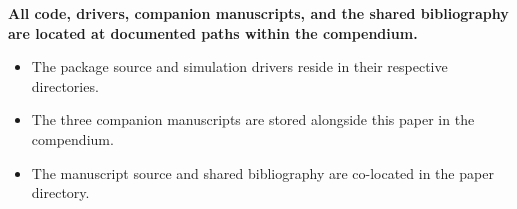 \documentclass[
  11pt,
]{article}
\begin{document}
\textbf{All code, drivers, companion manuscripts, and the shared bibliography are located at documented paths within the compendium.}

\begin{itemize}\setlength{\itemsep}{2pt}\setlength{\parskip}{0pt}
\item The package source and simulation drivers reside in their respective directories.
\item The three companion manuscripts are stored alongside this paper in the compendium.
\item The manuscript source and shared bibliography are co-located in the paper directory.
\end{itemize}
\end{document}

